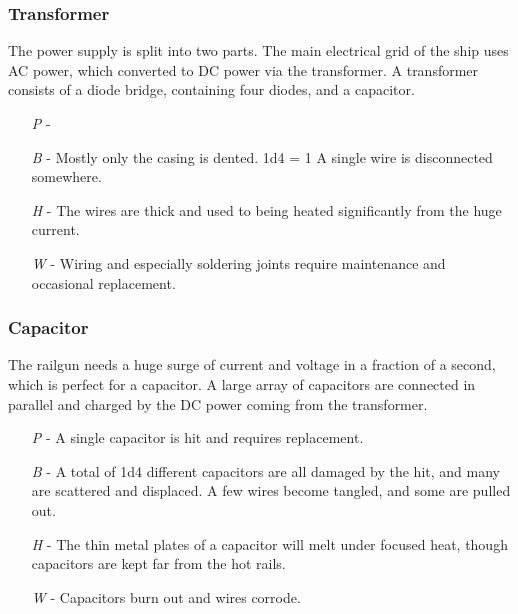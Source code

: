 \documentclass[a4paper]{article}
\begin{document}
\vspace{-0.5cm} \hspace{-18pt} \subsubsection{Transformer} \label{railgun_transformer} \vspace{-0.2cm}
The power supply is split into two parts. The main electrical grid of the ship uses AC power, which converted to DC power via the transformer. A transformer consists of a diode bridge, containing four diodes, and a capacitor.
\begin{enumerate}
\item [\textit{P}] - 
\item [\textit{B}] - Mostly only the casing is dented. \newline \hspace*{3pt} 1d4 = 1 A single wire is disconnected somewhere.
\item [\textit{H}] - The wires are thick and used to being heated significantly from the huge current.
\item [\textit{W}] - Wiring and especially soldering joints require maintenance and occasional replacement.
\end{enumerate}

\vspace{-0.5cm} \hspace{-18pt} \subsubsection{Capacitor} \label{railgun_capacitor} \vspace{-0.2cm}
The railgun needs a huge surge of current and voltage in a fraction of a second, which is perfect for a capacitor. A large array of capacitors are connected in parallel and charged by the DC power coming from the transformer.
\begin{enumerate}
\item [\textit{P}] - A single capacitor is hit and requires replacement.
\item [\textit{B}] - A total of 1d4 different capacitors are all damaged by the hit, and many are scattered and displaced. A few wires become tangled, and some are pulled out.
\item [\textit{H}] - The thin metal plates of a capacitor will melt under focused heat, though capacitors are kept far from the hot rails.
\item [\textit{W}] - Capacitors burn out and wires corrode.
\end{enumerate}
\end{document}

